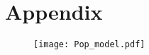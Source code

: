 \documentclass[reqno,11pt]{amsart}
\begin{document}
\vspace{1.5em}



\section{Appendix}
\label{sec:appendix}

\begin{figure}
\texttt{[image: Pop\_model.pdf]}
\vspace{-1.5em}
\end{figure}
\end{document}
